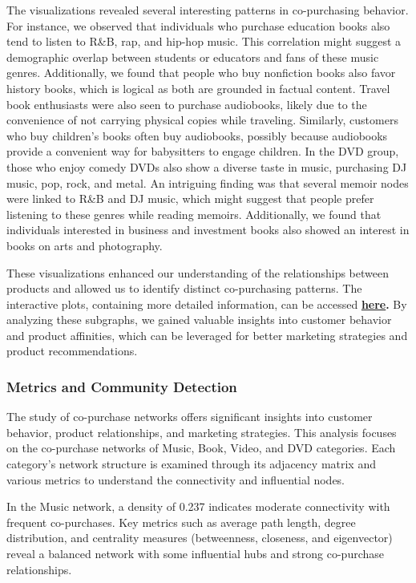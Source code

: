 \documentclass[
]{article}
\begin{document}
The visualizations revealed several interesting patterns in
co-purchasing behavior. For instance, we observed that individuals who
purchase education books also tend to listen to R\&B, rap, and hip-hop
music. This correlation might suggest a demographic overlap between
students or educators and fans of these music genres. Additionally, we
found that people who buy nonfiction books also favor history books,
which is logical as both are grounded in factual content. Travel book
enthusiasts were also seen to purchase audiobooks, likely due to the
convenience of not carrying physical copies while traveling. Similarly,
customers who buy children's books often buy audiobooks, possibly
because audiobooks provide a convenient way for babysitters to engage
children. In the DVD group, those who enjoy comedy DVDs also show a
diverse taste in music, purchasing DJ music, pop, rock, and metal. An
intriguing finding was that several memoir nodes were linked to R\&B and
DJ music, which might suggest that people prefer listening to these
genres while reading memoirs. Additionally, we found that individuals
interested in business and investment books also showed an interest in
books on arts and photography.

These visualizations enhanced our understanding of the relationships
between products and allowed us to identify distinct co-purchasing
patterns. The interactive plots, containing more detailed information,
can be accessed
\href{https://amazon-product-sna-visualization.netlify.app/}{\textbf{here}}\textbf{.}
By analyzing these subgraphs, we gained valuable insights into customer
behavior and product affinities, which can be leveraged for better
marketing strategies and product recommendations.

\subsubsection{Metrics and Community
Detection}\label{metrics-and-community-detection}

The study of co-purchase networks offers significant insights into
customer behavior, product relationships, and marketing strategies. This
analysis focuses on the co-purchase networks of Music, Book, Video, and
DVD categories. Each category's network structure is examined through
its adjacency matrix and various metrics to understand the connectivity
and influential nodes.

In the Music network, a density of 0.237 indicates moderate connectivity
with frequent co-purchases. Key metrics such as average path length,
degree distribution, and centrality measures (betweenness, closeness,
and eigenvector) reveal a balanced network with some influential hubs
and strong co-purchase relationships.
\end{document}
